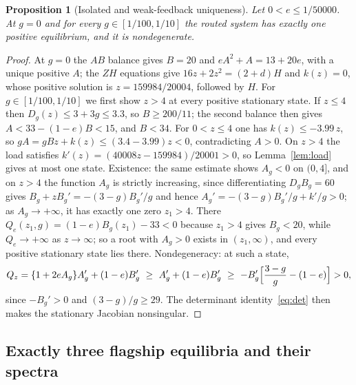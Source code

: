 \documentclass[11pt,a4paper]{article}
\theoremstyle{plain}
\newtheorem{proposition}[theorem]{Proposition}
\theoremstyle{definition}
\theoremstyle{remark}
\begin{document}
\begin{proposition}[Isolated and weak-feedback uniqueness]\label{prop:weak}
Let $0<e\le1/50000$. At $g=0$ and for every $g\in[1/100,1/10]$ the routed system has exactly one positive equilibrium, and it is nondegenerate.
\end{proposition}
\begin{proof}
At $g=0$ the $AB$ balance gives $B=20$ and $eA^2+A=13+20e$, with a unique positive $A$; the $ZH$ equations give $16z+2z^2=(2+d)H$ and $k(z)=0$, whose positive solution is $z=159984/20004$, followed by $H$. For $g\in[1/100,1/10]$ we first show $z>4$ at every positive stationary state. If $z\le4$ then $D_g(z)\le3+3g\le3.3$, so $B\ge200/11$; the second balance then gives $A<33-(1-e)B<15$, and $B<34$. For $0<z\le4$ one has $k(z)\le-3.99\,z$, so $gA=gBz+k(z)\le(3.4-3.99)z<0$, contradicting $A>0$. On $z>4$ the load satisfies $k'(z)=(40008z-159984)/20001>0$, so Lemma~\ref{lem:load} gives at most one state. Existence: the same estimate shows $A_g<0$ on $(0,4]$, and on $z>4$ the function $A_g$ is strictly increasing, since differentiating $D_gB_g=60$ gives $B_g+zB_g'=-(3-g)B_g'/g$ and hence $A_g'=-(3-g)B_g'/g+k'/g>0$; as $A_g\to+\infty$, it has exactly one zero $z_1>4$. There $Q_e(z_1,g)=(1-e)B_g(z_1)-33<0$ because $z_1>4$ gives $B_g<20$, while $Q_e\to+\infty$ as $z\to\infty$; so a root with $A_g>0$ exists in $(z_1,\infty)$, and every positive stationary state lies there. Nondegeneracy: at such a state,
\[
Q_z=\{1+2eA_g\}A_g'+(1-e)B_g'\ \ge\ A_g'+(1-e)B_g'\ \ge\ -B_g'\Bigl[\frac{3-g}{g}-(1-e)\Bigr]>0,
\]
since $-B_g'>0$ and $(3-g)/g\ge29$. The determinant identity~\eqref{eq:det} then makes the stationary Jacobian nonsingular.
\end{proof}

\subsection{Exactly three flagship equilibria and their spectra}
\end{document}
